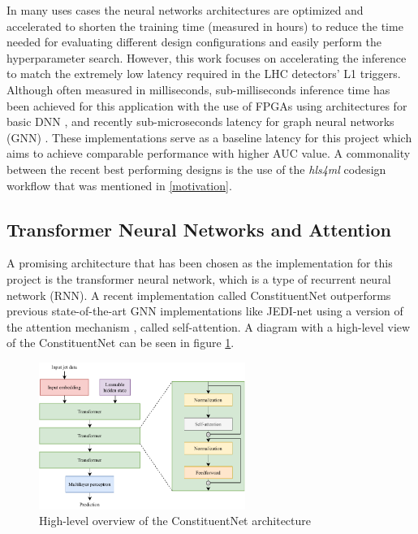 In many uses cases the neural networks architectures are optimized and accelerated to shorten the training time (measured in hours) to reduce the time needed for evaluating different design configurations and easily perform the hyperparameter search. However, this work focuses on accelerating the inference to match the extremely low latency required in the LHC detectors' L1 triggers. Although often measured in milliseconds, sub-milliseconds inference time has been achieved for this application with the use of FPGAs using architectures for basic DNN \cite{36-kreinar2018fast}, and recently sub-microseconds latency for graph neural networks (GNN) \cite{42-kreinar2020distance-weighted, 41-elabd2021graph}. These implementations serve as a baseline latency for this project which aims to achieve comparable performance with higher AUC value. A commonality between the recent best performing designs is the use of the \textit{hls4ml} codesign workflow that was mentioned in \autoref{motivation}.

\subsection{Transformer Neural Networks and Attention}
A promising architecture that has been chosen as the implementation for this project is the transformer neural network, which is a type of recurrent neural network (RNN). A recent implementation \cite{3-yuan2021constituentnet:} called ConstituentNet outperforms previous state-of-the-art GNN implementations like JEDI-net \cite{9-newman2019jedi-net:} using a version of the attention mechanism \cite{44-vaswani2017attention}, called self-attention. A diagram with a high-level view of the ConstituentNet can be seen in figure \ref{fig:constituent-net}.

\begin{figure}[hpt!]
  \centering
  \includegraphics[trim={0cm 0cm 0cm 0cm}, width=0.6\textwidth, center]{background/constituent_net.pdf}
  \caption{High-level overview of the ConstituentNet architecture}
  \label{fig:constituent-net}
\end{figure}

